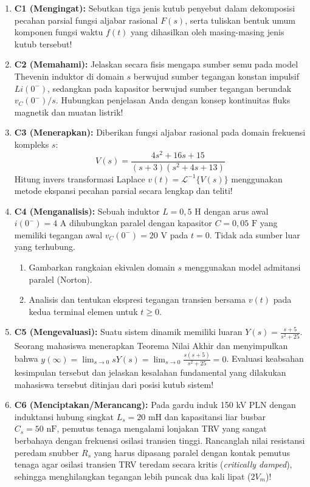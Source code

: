 \documentclass[11pt,a4paper]{article}
\theoremstyle{definition}
\begin{document}
\begin{enumerate}[leftmargin=*]
    \item \textbf{C1 (Mengingat):} 
    Sebutkan tiga jenis kutub penyebut dalam dekomposisi pecahan parsial fungsi aljabar rasional $F(s)$, serta tuliskan bentuk umum komponen fungsi waktu $f(t)$ yang dihasilkan oleh masing-masing jenis kutub tersebut!
    
    \item \textbf{C2 (Memahami):} 
    Jelaskan secara fisis mengapa sumber semu pada model Thevenin induktor di domain $s$ berwujud sumber tegangan konstan impulsif $L i(0^-)$, sedangkan pada kapasitor berwujud sumber tegangan berundak $v_C(0^-)/s$. Hubungkan penjelasan Anda dengan konsep kontinuitas fluks magnetik dan muatan listrik!
    
    \item \textbf{C3 (Menerapkan):} 
    Diberikan fungsi aljabar rasional pada domain frekuensi kompleks $s$:
    \begin{equation*}
        V(s) = \frac{4s^2 + 16s + 15}{(s + 3)(s^2 + 4s + 13)}
    \end{equation*}
    Hitung invers transformasi Laplace $v(t) = \mathcal{L}^{-1}\{V(s)\}$ menggunakan metode ekspansi pecahan parsial secara lengkap dan teliti!
    
    \item \textbf{C4 (Menganalisis):} 
    Sebuah induktor $L = 0{,}5\text{ H}$ dengan arus awal $i(0^-) = 4\text{ A}$ dihubungkan paralel dengan kapasitor $C = 0{,}05\text{ F}$ yang memiliki tegangan awal $v_C(0^-) = 20\text{ V}$ pada $t = 0$. Tidak ada sumber luar yang terhubung.
    \begin{enumerate}
        \item Gambarkan rangkaian ekivalen domain $s$ menggunakan model admitansi paralel (Norton).
        \item Analisis dan tentukan ekspresi tegangan transien bersama $v(t)$ pada kedua terminal elemen untuk $t \ge 0$.
    \end{enumerate}
    
    \item \textbf{C5 (Mengevaluasi):} 
    Suatu sistem dinamik memiliki luaran $Y(s) = \frac{s + 5}{s^2 + 25}$. Seorang mahasiswa menerapkan Teorema Nilai Akhir dan menyimpulkan bahwa $y(\infty) = \lim_{s \to 0} s Y(s) = \lim_{s \to 0} \frac{s(s+5)}{s^2 + 25} = 0$. Evaluasi keabsahan kesimpulan tersebut dan jelaskan kesalahan fundamental yang dilakukan mahasiswa tersebut ditinjau dari posisi kutub sistem!
    
    \item \textbf{C6 (Menciptakan/Merancang):} 
    Pada gardu induk 150 kV PLN dengan induktansi hubung singkat $L_s = 20\text{ mH}$ dan kapasitansi liar busbar $C_s = 50\text{ nF}$, pemutus tenaga mengalami lonjakan TRV yang sangat berbahaya dengan frekuensi osilasi transien tinggi.
    Rancanglah nilai resistansi peredam snubber $R_s$ yang harus dipasang paralel dengan kontak pemutus tenaga agar osilasi transien TRV teredam secara kritis (\textit{critically damped}), sehingga menghilangkan tegangan lebih puncak dua kali lipat ($2 V_m$)!
\end{enumerate}
\end{document}
